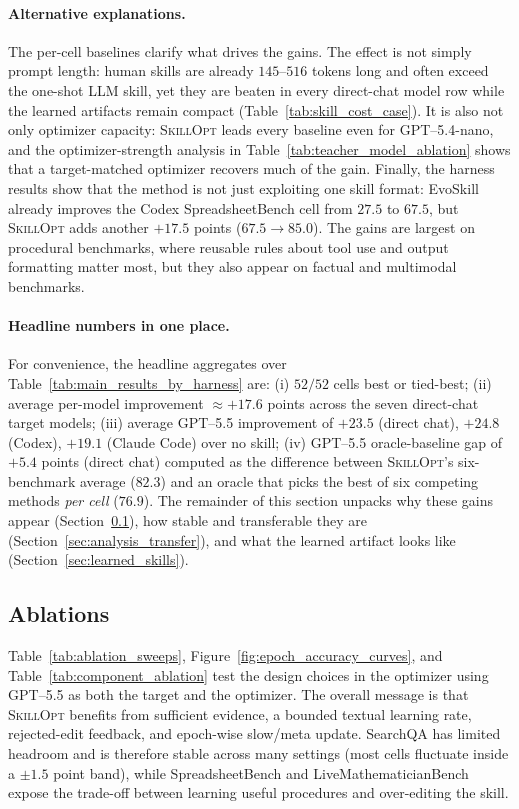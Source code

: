 \documentclass{llmxive}
\providecommand{\ourmethod}{\textsc{SkillOpt}\xspace}
\begin{document}
\paragraph{Alternative explanations.}
The per-cell baselines clarify what drives the gains. The effect is not simply prompt length: human skills are already $145$--$516$ tokens long and often exceed the one-shot LLM skill, yet they are beaten in every direct-chat model row while the learned artifacts remain compact (Table~\ref{tab:skill_cost_case}). It is also not only optimizer capacity: \ourmethod{} leads every baseline even for GPT--5.4-nano, and the optimizer-strength analysis in Table~\ref{tab:teacher_model_ablation} shows that a target-matched optimizer recovers much of the gain. Finally, the harness results show that the method is not just exploiting one skill format: EvoSkill already improves the Codex SpreadsheetBench cell from $27.5$ to $67.5$, but \ourmethod{} adds another $+17.5$ points ($67.5{\to}85.0$). The gains are largest on procedural benchmarks, where reusable rules about tool use and output formatting matter most, but they also appear on factual and multimodal benchmarks.

\paragraph{Headline numbers in one place.}
For convenience, the headline aggregates over Table~\ref{tab:main_results_by_harness} are:
(i) \textbf{$52/52$} cells best or tied-best;
(ii) average per-model improvement $\approx +17.6$ points across the seven direct-chat target models;
(iii) average GPT--5.5 improvement of $+23.5$ (direct chat), $+24.8$ (Codex), $+19.1$ (Claude Code) over no skill;
(iv) GPT--5.5 oracle-baseline gap of $+5.4$ points (direct chat) computed as the difference between \ourmethod{}'s six-benchmark average ($82.3$) and an oracle that picks the best of six competing methods \emph{per cell} ($76.9$).
The remainder of this section unpacks why these gains appear (Section~\ref{sec:optimizer_ablation}), how stable and transferable they are (Section~\ref{sec:analysis_transfer}), and what the learned artifact looks like (Section~\ref{sec:learned_skills}).

\subsection{Ablations}
\label{sec:optimizer_ablation}

Table~\ref{tab:ablation_sweeps}, Figure~\ref{fig:epoch_accuracy_curves}, and Table~\ref{tab:component_ablation} test the design choices in the optimizer using GPT--5.5 as both the target and the optimizer. The overall message is that \ourmethod{} benefits from sufficient evidence, a bounded textual learning rate, rejected-edit feedback, and epoch-wise slow/meta update. SearchQA has limited headroom and is therefore stable across many settings (most cells fluctuate inside a $\pm1.5$ point band), while SpreadsheetBench and LiveMathematicianBench expose the trade-off between learning useful procedures and over-editing the skill.
\end{document}
